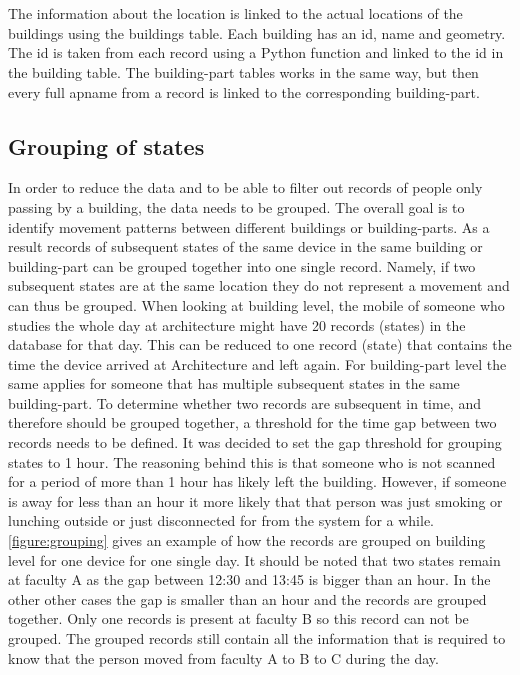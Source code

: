 \\\\
The information about the location is linked to the actual locations of the buildings using the buildings table. Each building has an id, name and geometry. The id is taken from each record using a Python function and linked to the id in the building table. The building-part tables works in the same way, but then every full apname from a record is linked to the corresponding building-part.

\subsection{Grouping of states}\label{grouping}
In order to reduce the data and to be able to filter out records of people only passing by a building, the data needs to be grouped. The overall goal is to identify movement patterns between different buildings or building-parts. As a result records of subsequent states of the same device in the same building or building-part can be grouped together into one single record. Namely, if two subsequent states are at the same location they do not represent a movement and can thus be grouped. When looking at building level, the mobile of someone who studies the whole day at architecture might have 20 records (states) in the database for that day. This can be reduced to one record (state) that contains the time the device arrived at Architecture and left again. For building-part level the same applies for someone that has multiple subsequent states in the same building-part. To determine whether two records are subsequent in time, and therefore should be grouped together, a threshold for the time gap between two records needs to be defined. It was decided to set the gap threshold for grouping states to 1 hour. The reasoning behind this is that someone who is not scanned for a period of more than 1 hour has likely left the building. However, if someone is away for less than an hour it more likely that that person was just smoking or lunching outside or just disconnected for from the system for a while. \autoref{figure:grouping} gives an example of how the records are grouped on building level for one device for one single day. It should be noted that two states remain at faculty A as the gap between 12:30 and 13:45 is bigger than an hour. In the other other cases the gap is smaller than an hour and the records are grouped together. Only one records is present at faculty B so this record can not be grouped. The grouped records still contain all the information that is required to know that the person moved from faculty A to B to C during the day. 

